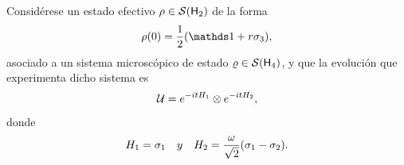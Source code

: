 \newpage


Considérese un estado efectivo $\rho\in\mathcal{S}({\sf H}_{2})$ de la forma
\begin{equation*}
    \rho(0)=\frac{1}{2}(\Id+r\pauli{3}),
\end{equation*}
asociado a un sistema microscópico de estado $\varrho\in\mathcal{S}({\sf H}_{4})$, y que la evolución que experimenta dicho sistema es
\begin{equation*}
    \mathcal{U}=e^{-itH_{1}}\otimes e^{-itH_{2}},
\end{equation*}
donde
\begin{align*}
    H_{1}=\sigma_{1} & & y & &H_{2}=\frac{\omega}{\sqrt{2}}(\sigma_{1}-\sigma_{2}).
\end{align*}

